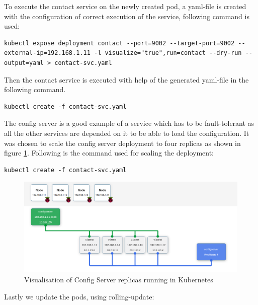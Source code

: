 To execute the contact service on the newly created pod, a yaml-file is created with the configuration of correct execution of the service, following command is used:
\begin{lstlisting}[frame=single, ]
kubectl expose deployment contact --port=9002 --target-port=9002 --external-ip=192.168.1.11 -l visualize="true",run=contact --dry-run --output=yaml > contact-svc.yaml
\end{lstlisting}

Then the contact service is executed with help of the generated yaml-file in the following command.
\begin{lstlisting}[frame=single, ]
kubectl create -f contact-svc.yaml
\end{lstlisting}

The config server is a good example of a service which has to be fault-tolerant as all the other services are depended on it to be able to load the configuration. It was chosen to scale the config server deployment to four replicas as shown in figure \ref{fig:configserver-visual}. Following is the command used for scaling the deployment:
\begin{lstlisting}[frame=single, ]
kubectl create -f contact-svc.yaml
\end{lstlisting}

\begin{figure}[bth]
	\centering 
	\includegraphics[width=1.4\linewidth]{gfx/configServer4Replicas}
	\caption[configserver]{Visualisation of Config Server replicas running in Kubernetes} \label{fig:configserver-visual}
\end{figure}


Lastly we update the pods, using rolling-update:





